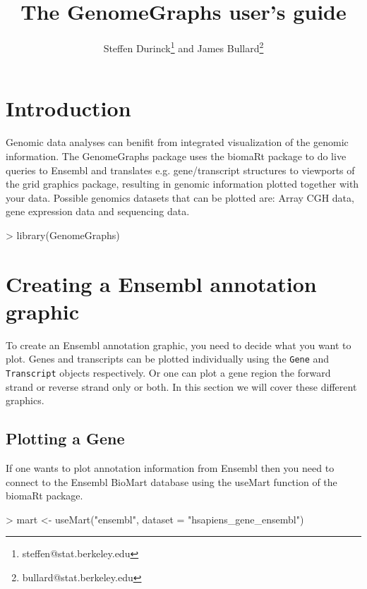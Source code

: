 \documentclass[11pt]{article}
\author{Steffen Durinck\footnote{steffen@stat.berkeley.edu} and James
  Bullard\footnote{bullard@stat.berkeley.edu}}
\newcommand{\Robject}[1]{{\texttt{#1}}}
\begin{document}
\title{The GenomeGraphs user's guide}

\maketitle

\tableofcontents
\section{Introduction}

Genomic data analyses can benifit from integrated visualization of the
genomic information.  The GenomeGraphs package uses the biomaRt
package to do live queries to Ensembl and translates
e.g. gene/transcript structures to viewports of the grid graphics
package, resulting in genomic information plotted together with your
data.  Possible genomics datasets that can be plotted are: Array CGH
data, gene expression data and sequencing data.

\begin{Schunk}
\begin{Sinput}
> library(GenomeGraphs)
\end{Sinput}
\end{Schunk}


\section{Creating a Ensembl annotation graphic}

To create an Ensembl annotation graphic, you need to decide what you
want to plot.  Genes and transcripts can be plotted individually using
the \Robject{Gene} and \Robject{Transcript} objects respectively.  Or
one can plot a gene region the forward strand or reverse strand only
or both.  In this section we will cover these different graphics.

\subsection{Plotting a Gene}

If one wants to plot annotation information from Ensembl then you need
to connect to the Ensembl BioMart database using the useMart function
of the biomaRt package.

\begin{Schunk}
\begin{Sinput}
> mart <- useMart("ensembl", dataset = "hsapiens_gene_ensembl")
\end{Sinput}
\end{Schunk}
\end{document}
